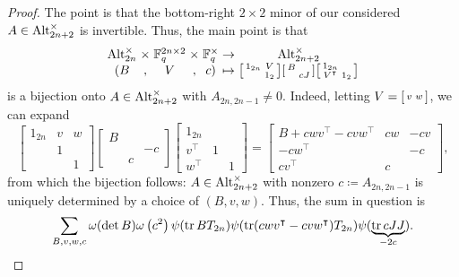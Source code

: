 \begin{proof}
    The point is that the bottom-right $2\times2$ minor of our considered $A\in\operatorname{Alt}_{2n+2}^\times$ is invertible. Thus, the main point is that
    \[\arraycolsep=1.4pt\begin{array}{ccccccccccc}
        \Alt_{2n}^\times &\times& \FF_q^{2n\times2} &\times& \FF_q^\times &\to& \Alt_{2n+2}^\times \\
        (B &,& V &,& c) &\mapsto& \begin{bsmallmatrix}
            1_{2n} & V \\ & 1_2
        \end{bsmallmatrix}\begin{bsmallmatrix}
            B \\ & cJ
        \end{bsmallmatrix}\begin{bsmallmatrix}
            1_{2n} \\ V^\intercal & 1_2
        \end{bsmallmatrix}
    \end{array}\]
    is a bijection onto $A\in\operatorname{Alt}_{2n+2}^\times$ with $A_{2n,2n-1}\ne0$. Indeed, letting $V=\begin{bsmallmatrix}
        v & w
    \end{bsmallmatrix}$, we can expand
    \[\begin{bmatrix}
        1_{2n} & v & w \\
        & 1 \\ && 1
    \end{bmatrix}\begin{bmatrix}
        B \\ && -c \\ & c
    \end{bmatrix}\begin{bmatrix}
        1_{2n} \\ v^\intercal & 1 \\ w^\intercal && 1
    \end{bmatrix}=\begin{bmatrix}
        B+cwv^\intercal-cvw^\intercal & cw & -cv \\
        -cw^\intercal && -c \\
        cv^\intercal & c
    \end{bmatrix},\]
    from which the bijection follows: $A\in\operatorname{Alt}_{2n+2}^\times$ with nonzero $c\coloneqq A_{2n,2n-1}$ is uniquely determined by a choice of $(B,v,w)$. Thus, the sum in question is
    \[\sum_{B,v,w,c}\omega(\det B)\omega\left(c^2\right)\psi(\operatorname{tr} BT_{2n})\psi(\operatorname{tr}(cwv^\intercal-cvw^\intercal)T_{2n})\psi(\underbrace{\operatorname{tr} cJJ}_{-2c}).\]

\end{proof}
